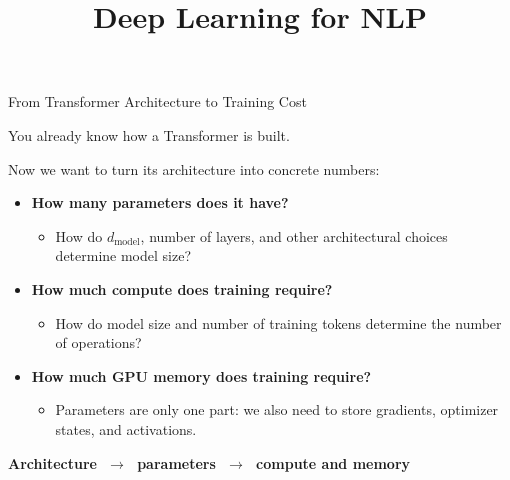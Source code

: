 \documentclass[11pt,compress,t,notes=noshow, xcolor=table]{beamer}
\title{Deep Learning for NLP}
\begin{document}




\begin{vbframe}{From Transformer Architecture to Training Cost}

\vfill

You already know how a Transformer is built.

Now we want to turn its architecture into concrete numbers:

\begin{itemize}
    \item \textbf{How many parameters does it have?}
    \begin{itemize}
        \item How do $d_{\text{model}}$, number of layers, and other
        architectural choices determine model size?
    \end{itemize}

    \item \textbf{How much compute does training require?}
    \begin{itemize}
        \item How do model size and number of training tokens determine
        the number of operations?
    \end{itemize}

    \item \textbf{How much GPU memory does training require?}
    \begin{itemize}
        \item Parameters are only one part: we also need to store
        gradients, optimizer states, and activations.
    \end{itemize}
\end{itemize}

\centering
\textbf{Architecture $\;\longrightarrow\;$ parameters
$\;\longrightarrow\;$ compute and memory}

\vfill

\end{vbframe}

\end{document}
